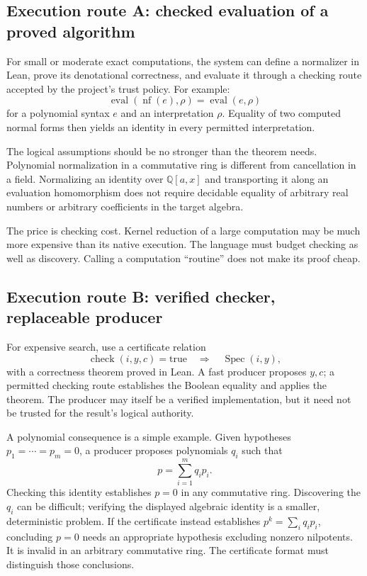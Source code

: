 \documentclass[11pt,a4paper]{article}
\newcommand{\Q}{\mathbb Q}
\newcommand{\Spec}{\operatorname{Spec}}
\newcommand{\checkc}{\operatorname{check}}
\theoremstyle{definition}
\begin{document}
\subsection{Execution route A: checked evaluation of a proved algorithm}
For small or moderate exact computations, the system can define a normalizer in Lean, prove its denotational correctness, and evaluate it through a checking route accepted by the project's trust policy. For example:
\[
 \operatorname{eval}(\operatorname{nf}(e),\rho)
   =\operatorname{eval}(e,\rho)
\]
for a polynomial syntax \(e\) and an interpretation \(\rho\). Equality of two computed normal forms then yields an identity in every permitted interpretation.

The logical assumptions should be no stronger than the theorem needs. Polynomial normalization in a commutative ring is different from cancellation in a field. Normalizing an identity over \(\Q[a,x]\) and transporting it along an evaluation homomorphism does not require decidable equality of arbitrary real numbers or arbitrary coefficients in the target algebra.

The price is checking cost. Kernel reduction of a large computation may be much more expensive than its native execution. The language must budget checking as well as discovery. Calling a computation ``routine'' does not make its proof cheap.

\subsection{Execution route B: verified checker, replaceable producer}
For expensive search, use a certificate relation
\[
 \checkc(i,y,c)=\mathrm{true}
 \quad\Longrightarrow\quad \Spec(i,y),
\]
with a correctness theorem proved in Lean. A fast producer proposes \(y,c\); a permitted checking route establishes the Boolean equality and applies the theorem. The producer may itself be a verified implementation, but it need not be trusted for the result's logical authority.

A polynomial consequence is a simple example. Given hypotheses \(p_1=\cdots=p_m=0\), a producer proposes polynomials \(q_i\) such that
\[
       p=\sum_{i=1}^{m}q_i p_i.
\]
Checking this identity establishes \(p=0\) in any commutative ring. Discovering the \(q_i\) can be difficult; verifying the displayed algebraic identity is a smaller, deterministic problem. If the certificate instead establishes \(p^k=\sum_iq_ip_i\), concluding \(p=0\) needs an appropriate hypothesis excluding nonzero nilpotents. It is invalid in an arbitrary commutative ring. The certificate format must distinguish those conclusions.
\end{document}
